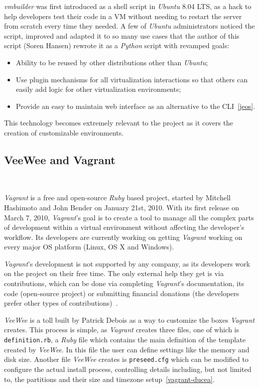 \textit{vmbuilder} was first introduced as a shell script in \textit{Ubuntu} 8.04 LTS, as a hack to help developers test their code in a VM without needing to restart the server from scratch every time they needed. A few of \textit{Ubuntu} administrators noticed the script, improved and adapted it to so many use cases that the author of this script (Soren Hansen) rewrote it as a \textit{Python} script with revamped goals:

\begin{itemize}
\item Ability to be reused by other distributions other than \textit{Ubuntu};
\item Use plugin mechanisms for all virtualization interactions so that others can easily add logic for other virtualization environments;
\item Provide an easy to maintain web interface as an alternative to the CLI~\ref{jeos}.
\end{itemize}

This technology becomes extremely relevant to the project as it covers the creation of customizable environments.
\subsection{VeeWee and Vagrant}~\label{subsec:veewee}

\textit{Vagrant} is a free and open-source \textit{Ruby} based project, started by Mitchell Hashimoto and John Bender on January 21st, 2010. With its first release on March 7, 2010, \textit{Vagrant}'s goal is to create a tool to manage all the complex parts of development within a virtual environment without affecting the developer's workflow. Its developers are currently working on getting \textit{Vagrant} working on every major OS platform (Linux, OS X and Windows).

\textit{Vagrant}'s development is not supported by any company, as its developers work on the project on their free time. The only external help they get is via contributions, which can be done via completing \textit{Vagrant}'s documentation, its code (open-source project) or submitting financial donations (the developers prefer other types of contributions)~\cite{vagrant-contribution}.

\textit{VeeWee} is a toll built by Patrick Debois as a way to customize the boxes \textit{Vagrant} creates. This process is simple, as \textit{Vagrant} creates three files, one of which is \texttt{definition.rb}, a \textit{Ruby} file which contains the main definition of the template created by \textit{VeeWee}. In this file the user can define settings like the memory and disk size. Another file \textit{VeeWee} creates is \texttt{preseed.cfg} which can be modified to configure the actual install process, controlling details including, but not limited to, the partitions and their size and timezone setup~\ref{vagrant-ducea}.

